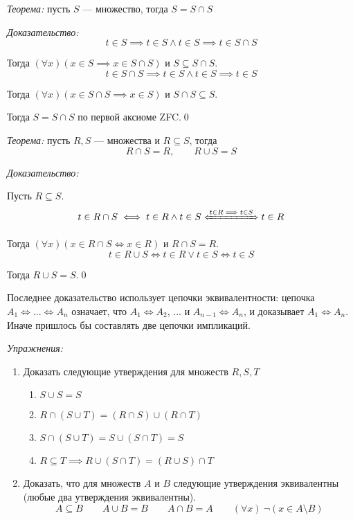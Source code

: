 {\it Теорема:} пусть $S$ --- множество, тогда $S=S\cap S$

{\it Доказательство:}
\[
	t\in S\implies t\in S\land t\in S\implies t\in S\cap S
\]

Тогда $(\forall x)(x\in S\implies x\in S\cap S)$ и $S\subseteq S\cap S$.
\[
	t\in S\cap S\implies t\in S\land t\in S\implies t\in S
\]

Тогда $(\forall x)(x\in S\cap S\implies x\in S)$ и $S\cap S\subseteq S$.

Тогда $S=S\cap S$ по первой аксиоме ZFC.\qed

\vspace{1em}
{\it Теорема:} пусть $R,S$ --- множества и $R\subseteq S$, тогда
\[
	R\cap S= R,\qquad R\cup S= S
\]

{\it Доказательство:}

Пусть $R\subseteq S$.
\[
	t\in R\cap S\iff t\in R\land t\in S\xLeftrightarrow{t\in R\implies t\in S} t\in R
\]

Тогда $(\forall x)(x\in R\cap S\iff x\in R)$ и $R\cap S=R$.
\[
	t\in R\cup S\iff t\in R\lor t\in S\iff t\in S
\]

Тогда $R\cup S=S$.\qed

Последнее доказательство использует цепочки эквивалентности:
цепочка $A_1\iff...\iff A_{n}$ означает, что $A_1\iff A_2$, ... и
$A_{n-1}\iff A_{n}$, и доказывает $A_1\iff A_{n}$. Иначе пришлось
бы составлять две цепочки импликаций.

\pagebreak

\newcommand\eset{\varnothing}
{\it Упражнения:}
\begin{enumerate}
	\item{}Доказать следующие утверждения для множеств $R,S,T$
	\begin{fullwidth}
		\begin{multicols}{2}
			\begin{enumerate}
				\item{}$S\cup S=S$
				\item{}$R\cap (S\cup T)=(R\cap S)\cup (R\cap T)$
				\item{}$S\cap (S\cup T)=S\cup (S\cap T)=S$
				\item{}$R\subseteq T\implies R\cup (S\cap T)=(R\cup S)\cap T$
			\end{enumerate}
		\end{multicols}
	\end{fullwidth}

	\item{}Доказать, что для множеств $A$ и $B$ следующие утверждения эквивалентны
	(любые два утверждения эквивалентны).
	\[
		A\subseteq B\qquad A\cup B=B\qquad A\cap B=A
		\qquad (\forall x)~\lnot(x\in A\setminus B)
	\]
\end{enumerate}

